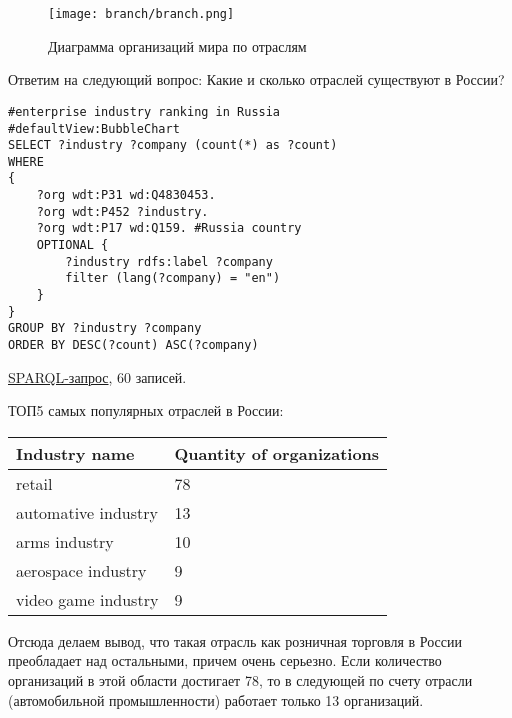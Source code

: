 \begin{figure}[h]
	\texttt{[image: branch/branch.png]}
	\centering
	\caption{Диаграмма организаций мира по отраслям}
	\centering
\end{figure}


Ответим на следующий вопрос: Какие и сколько отраслей существуют в России?

\begin{lstlisting}[language=SPARQL]
#enterprise industry ranking in Russia
#defaultView:BubbleChart
SELECT ?industry ?company (count(*) as ?count) 
WHERE 
{
    ?org wdt:P31 wd:Q4830453.
    ?org wdt:P452 ?industry.
    ?org wdt:P17 wd:Q159. #Russia country
    OPTIONAL {
		?industry rdfs:label ?company
		filter (lang(?company) = "en")
	}
}
GROUP BY ?industry ?company
ORDER BY DESC(?count) ASC(?company)
\end{lstlisting}

\href{https://query.wikidata.org/#%23enterprise%20industry%20ranking%0A%23defaultView%3ABubbleChart%0ASELECT%20%3Findustry%20%3Fcompany%20%28count%28%2a%29%20as%20%3Fcount%29%20%0AWHERE%20%0A%7B%0A%20%20%20%20%3Forg%20wdt%3AP31%20wd%3AQ4830453.%0A%20%20%20%20%3Forg%20wdt%3AP452%20%3Findustry%20.%0A%20%20%20%20%3Forg%20wdt%3AP17%20wd%3AQ159.%20%23Russia%20country%0A%20%20%20%20OPTIONAL%20%7B%0A%09%09%3Findustry%20rdfs%3Alabel%20%3Fcompany%0A%09%09filter%20%28lang%28%3Fcompany%29%20%3D%20%22en%22%29%0A%09%7D%0A%7D%0AGROUP%20BY%20%3Findustry%20%3Fcompany%0AORDER%20BY%20DESC%28%3Fcount%29%20ASC%28%3Fcompany%29%0A}{SPARQL-запрос}, 60 записей.

ТОП5 самых популярных отраслей в России: \\
\begin{tabular}{|l|l|}
\hline
\textbf{Industry name} & \textbf{Quantity of organizations} \\
\hline
retail & 78 \\
\hline
automative industry & 13 \\	
\hline
arms industry & 10 \\
\hline
aerospace industry & 9 \\
\hline
video game industry & 9 \\
\hline
\end{tabular}

Отсюда делаем вывод, что такая отрасль как розничная торговля в России преобладает над остальными, причем очень серьезно. Если количество организаций в этой области достигает 78, то в следующей по счету отрасли (автомобильной промышленности) работает только 13 организаций.

